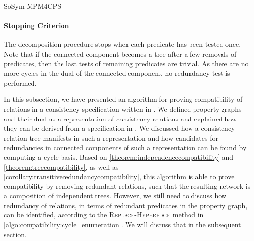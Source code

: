\begin{copiedFrom}{SoSym MPM4CPS}
\paragraph{Stopping Criterion}
The decomposition procedure stops when each predicate has been tested once. Note that if the connected component becomes a tree after a few removals of predicates, then the last tests of remaining predicates are trivial. As there are no more cycles in the dual of the connected component, no redundancy test is performed.

In this subsection, we have presented an algorithm for proving compatibility of relations in a consistency specification written in \qvtr.
We defined property graphs and their dual as a representation of consistency relations and explained how they can be derived from a specification in \qvtr.
We discussed how a consistency relation tree manifests in such a representation and how candidates for redundancies in connected components of such a representation can be found by computing a cycle basis.
Based on \autoref{theorem:independencecompatibility} and \autoref{theorem:treecompatibility}, as well as \autoref{corollary:transitiveredundancycompatibility}, this algorithm is able to prove compatibility by removing redundant relations, such that the resulting network is a composition of independent trees.
However, we still need to discuss how redundancy of relations, in terms of redundant predicates in the property graph, can be identified, according to the \textsc{Replace-Hyperedge} method in \autoref{algo:compatibility:cycle_enumeration}.
We will discuss that in the subsequent section.



\end{copiedFrom}

